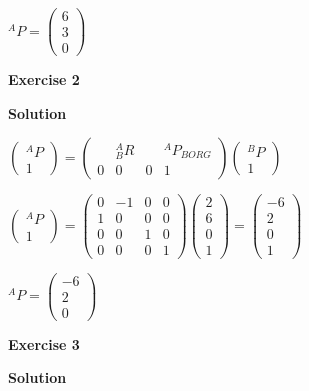 \documentclass[12pt]{article}
\begin{document}
$^AP=\left(\begin{array}{c}
6 \\
3\\
0\end{array}\right)$

\medskip

\textbf{Exercise 2}		
		
\textbf{Solution}

\medskip

$\left(\begin{array}{c}
^AP \\
1\end{array}\right) =  \left(\begin{array}{cccc}
\ & _{B}^AR & \ &^AP_{BORG} \\
0 & 0 & 0 & 1  \end{array}\right)\left(\begin{array}{c}
^BP \\
1\end{array}\right)$

$\left(\begin{array}{c}
^AP \\
1\end{array}\right) =  \left(\begin{array}{cccc}
0 & -1 & 0 & 0 \\
1 & 0 & 0 & 0 \\
0 & 0 & 1 & 0 \\
0 & 0 & 0 & 1  \end{array}\right)\left(\begin{array}{c}
2 \\
6\\
0\\
1\end{array}\right)=\left(\begin{array}{c}
-6 \\
2 \\
0 \\
1\end{array}\right)$	

$^AP=\left(\begin{array}{c}
-6 \\
2\\
0\end{array}\right)$

\medskip

\textbf{Exercise 3}		
		
\textbf{Solution}

\medskip
\end{document}
